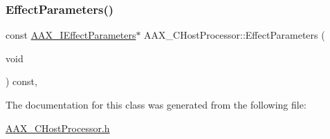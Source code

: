 \mbox{\label{a01485_a68e172bc2baa53974708fc95404c0fce}} 
\subsubsection{\texorpdfstring{EffectParameters()}{EffectParameters()}\hspace{0.1cm}{\footnotesize\ttfamily [2/2]}}
{\footnotesize\ttfamily const \mbox{\hyperlink{a01825}{A\+A\+X\+\_\+\+I\+Effect\+Parameters}}$\ast$ A\+A\+X\+\_\+\+C\+Host\+Processor\+::\+Effect\+Parameters (\begin{DoxyParamCaption}\item[{void}]{ }\end{DoxyParamCaption}) const\hspace{0.3cm}{\ttfamily [inline]}, {\ttfamily [protected]}}



The documentation for this class was generated from the following file\+:\begin{DoxyCompactItemize}
\item 
\mbox{\hyperlink{a00431}{A\+A\+X\+\_\+\+C\+Host\+Processor.\+h}}\end{DoxyCompactItemize}
